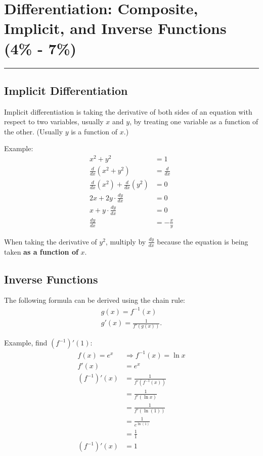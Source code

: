 \documentclass[12pt]{article}
\begin{document}
    \section{Differentiation: Composite, Implicit, and Inverse Functions (4\% - 7\%)}
    \par\noindent\rule{\textwidth}{0.1pt}
        \subsection{Implicit Differentiation}
            Implicit differentiation is taking the derivative of both sides of an equation with respect to two variables, usually $x$ and $y$, by treating one variable as a function of the other. (Usually $y$ is a function of $x$.)

            \noindent Example:
            \begin{align*}
                x^2 + y^2 &= 1 \\
                \frac{d}{dx} \left( x^2 + y^2 \right) &= \frac{d}{dx} \\[6pt]
                \frac{d}{dx} \left( x^2 \right) + \frac{d}{dx} \left( y^2 \right) &= 0 \\[6pt]
                2x + 2y \cdot \frac{dy}{dx} &= 0 \\[6pt]
                x + y \cdot \frac{dy}{dx} &= 0 \\[6pt]
                \frac{dy}{dx} &= -\frac{x}{y}
            \end{align*}

            When taking the derivative of $y^2$, multiply by $\frac{dy}{dx}$ because the equation is being taken \textbf{as a function of} $x$.

        \subsection{Inverse Functions}
            \noindent The following formula can be derived using the chain rule:
            \begin{gather*}
                g(x) = f^{-1}(x) \\
                g'(x) = \frac{1}{f'\left( g(x) \right)}.
            \end{gather*}

            \noindent Example, find $(f^{-1})'(1)$:
            \begin{align*}
                f(x) = e^x &\Rightarrow f^{-1}(x) = \ln{x} \\
                f'(x) &= e^x \\
                (f^{-1})'(x) &= \frac{1}{f' \left( f^{-1}(x) \right)} \\[6pt]
                &= \frac{1}{f'(\ln{x})} \\[6pt]
                &= \frac{1}{f'(\ln{(1)})} \\[6pt]
                &= \frac{1}{e^{\ln{(1)}}} \\[6pt]
                &= \frac{1}{1} \\[6pt]
                (f^{-1})'(x) &= 1
            \end{align*}
\end{document}

